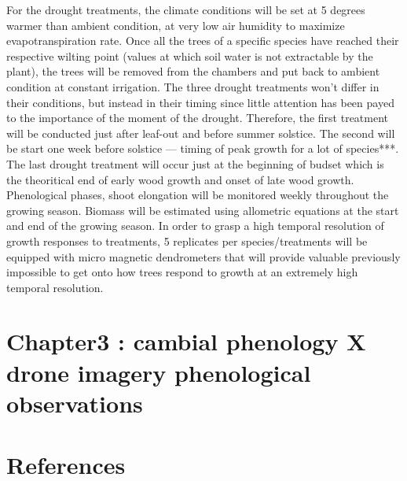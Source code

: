 \documentclass{article}
\begin{document}
For the drought treatments, the climate conditions will be set at 5 degrees warmer than ambient condition, at very low air humidity to maximize evapotranspiration rate. Once all the trees of a specific species have reached their respective wilting point (values at which soil water is not extractable by the plant), the trees will be removed from the chambers and put back to ambient condition at constant irrigation. The three drought treatments won't differ in their conditions, but instead in their timing since little attention has been payed to the importance of the moment of the drought. Therefore, the first treatment will be conducted just after leaf-out and before summer solstice. The second will be start one week before solstice --- timing of peak growth for a lot of species***. The last drought treatment will occur just at the beginning of budset which is the theoritical end of early wood growth and onset of late wood growth. Phenological phases, shoot elongation will be monitored weekly throughout the growing season. Biomass will be estimated using allometric equations at the start and end of the growing season. In order to grasp a high temporal resolution of growth responses to treatments, 5 replicates per species/treatments will be equipped with micro magnetic dendrometers that will provide valuable previously impossible to get onto how trees respond to growth at an extremely high temporal resolution. 

\section*{Chapter3 : cambial phenology X drone imagery phenological observations}


\section{References}

\end{document}
